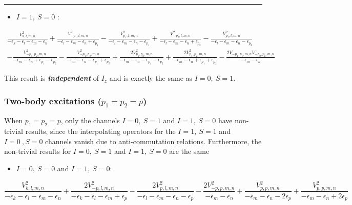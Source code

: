 \documentclass[
  letterpaper,
  DIV=11,
  numbers=noendperiod]{scrartcl}
\providecommand{\tightlist}{%
  \setlength{\itemsep}{0pt}\setlength{\parskip}{0pt}}
\begin{document}
\begin{center}\rule{0.5\linewidth}{0.5pt}\end{center}

\begin{itemize}
\tightlist
\item
  \(I=1,\ S=0\) :
\end{itemize}

\begin{multline}
\frac{V_{k,l,m,n}^2}{-\epsilon _k-\epsilon _l-\epsilon _m-\epsilon _n}+\frac{V_{-p_1,l,m,n}^2}{-\epsilon _l-\epsilon _m-\epsilon _n+\epsilon _{p_1}}-\frac{V_{p_1,l,m,n}^2}{-\epsilon _l-\epsilon _m-\epsilon _n-\epsilon _{p_1}}+\frac{V_{-p_2,l,m,n}^2}{-\epsilon _l-\epsilon _m-\epsilon _n+\epsilon
   _{p_2}}-\frac{V_{p_2,l,m,n}^2}{-\epsilon _l-\epsilon _m-\epsilon _n-\epsilon _{p_2}}\\
   -\frac{V_{-p_1,p_2,m,n}^2}{-\epsilon _m-\epsilon _n+\epsilon _{p_1}-\epsilon _{p_2}}-\frac{V_{-p_1,p_2,m,n}^2}{-\epsilon _m-\epsilon _n-\epsilon _{p_1}+\epsilon _{p_2}}+\frac{2 V_{p_1,p_2,m,n}^2}{-\epsilon _m-\epsilon
   _n-\epsilon _{p_1}-\epsilon _{p_2}}+\frac{2 V_{p_1,p_2,m,n}^2}{-\epsilon _m-\epsilon _n+\epsilon _{p_1}+\epsilon _{p_2}}-\frac{2 V_{-p_1,p_1,m,n} V_{-p_2,p_2,m,n}}{-\epsilon _m-\epsilon _n}
\end{multline}

This result is \textbf{\emph{independent}} of \(I_z\) and is exactly the
same as \(I=0,\ S=1\).

\subsubsection{\texorpdfstring{Two-body excitations
(\(p_1= p_2=p\))}{Two-body excitations (p\_1= p\_2=p)}}\label{two-body-excitations-p_1-p_2p}

When \(p_1=p_2=p\), only the channels \(I=0,\ S=1\) and \(I=1,\ S=0\)
have non-trivial results, since the interpolating operators for the
\(I=1,\ S=1\) and \(I=0\ ,S=0\) channels vanish due to anti-commutation
relations. Furthermore, the non-trivial results for \(I=0,\ S=1\) and
\(I=1,\ S=0\) are the same

\begin{itemize}
\tightlist
\item
  \(I=0,\ S=0\) and \(I=1,\ S=0\):
\end{itemize}

\begin{equation}
\frac{V_{k,l,m,n}^2}{-\epsilon _k-\epsilon _l-\epsilon _m-\epsilon _n}+\frac{2 V_{-p,l,m,n}^2}{-\epsilon _k-\epsilon _l-\epsilon _m+\epsilon _p}-\frac{2 V_{p,l,m,n}^2}{-\epsilon _l-\epsilon _m-\epsilon _n-\epsilon _p}
-\frac{2 V_{-p,p,m,n}^2}{-\epsilon _m-\epsilon _n}+\frac{V_{p,p,m,n}^2}{-\epsilon _m-\epsilon
   _n-2 \epsilon _p}+\frac{V_{p,p,m,n}^2}{-\epsilon _m-\epsilon _n+2 \epsilon _p}
\end{equation}
\end{document}
